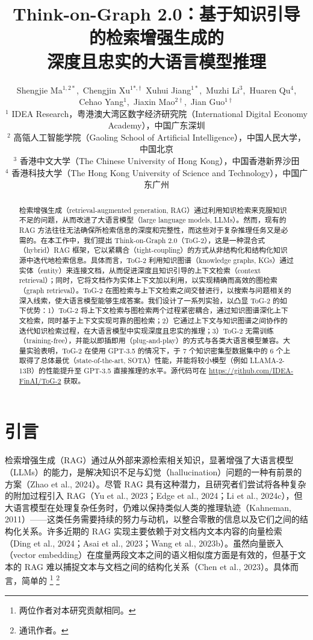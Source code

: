 \documentclass[11pt,UTF8,fontset=fandol]{ctexart}
\title{\textbf{Think-on-Graph 2.0：基于知识引导的检索增强生成的\\深度且忠实的大语言模型推理}}
\author{Shengjie Ma$^{1,2*}$,~Chengjin Xu$^{1*,\dagger}$~Xuhui Jiang$^{1*}$,~Muzhi Li$^{3}$,~Huaren Qu$^{4}$,\\
Cehao Yang$^{1}$,~Jiaxin Mao$^{2\dagger}$,~Jian Guo$^{1\dagger}$\\[0.3em]
\small $^{1}$ IDEA Research，粤港澳大湾区数字经济研究院（International Digital Economy Academy），中国广东深圳\\
\small $^{2}$ 高瓴人工智能学院（Gaoling School of Artificial Intelligence），中国人民大学，中国北京\\
\small $^{3}$ 香港中文大学（The Chinese University of Hong Kong），中国香港新界沙田\\
\small $^{4}$ 香港科技大学（The Hong Kong University of Science and Technology），中国广东广州}
\date{}
\newcommand{\toctwo}{ToG-2}
\begin{document}
\maketitle

\renewcommand{\thefootnote}{\arabic{footnote}}

\begin{abstract}
检索增强生成（retrieval-augmented generation, RAG）通过利用知识检索来克服知识不足的问题，从而改进了大语言模型（large language models, LLMs）。然而，现有的 RAG 方法往往无法确保所检索信息的深度和完整性，而这些对于复杂推理任务又是必需的。在本工作中，我们提出 Think-on-Graph 2.0（\toctwo{}），这是一种混合式（hybrid）RAG 框架，它以紧耦合（tight-coupling）的方式从非结构化和结构化知识源中迭代地检索信息。具体而言，\toctwo{} 利用知识图谱（knowledge graphs, KGs）通过实体（entity）来连接文档，从而促进深度且知识引导的上下文检索（context retrieval）；同时，它将文档作为实体上下文加以利用，以实现精确而高效的图检索（graph retrieval）。\toctwo{} 在图检索与上下文检索之间交替进行，以搜索与问题相关的深入线索，使大语言模型能够生成答案。我们设计了一系列实验，以凸显 \toctwo{} 的如下优势：1）\toctwo{} 将上下文检索与图检索两个过程紧密耦合，通过知识图谱深化上下文检索，同时基于上下文实现可靠的图检索；2）它通过上下文与知识图谱之间协作的迭代知识检索过程，在大语言模型中实现深度且忠实的推理；3）\toctwo{} 无需训练（training-free），并能以即插即用（plug-and-play）的方式与各类大语言模型兼容。大量实验表明，\toctwo{} 在使用 GPT-3.5 的情况下，于 7 个知识密集型数据集中的 6 个上取得了总体最优（state-of-the-art, SOTA）性能，并能将较小模型（例如 LLAMA-2-13B）的性能提升至 GPT-3.5 直接推理的水平。源代码可在 \url{https://github.com/IDEA-FinAI/ToG-2} 获取。
\end{abstract}

\section{引言}

检索增强生成（RAG）通过从外部来源检索相关知识，显著增强了大语言模型（LLMs）的能力，是解决知识不足与幻觉（hallucination）问题的一种有前景的方案（Zhao et al., 2024）。尽管 RAG 具有这种潜力，且研究者们尝试将各种复杂的附加过程引入 RAG（Yu et al., 2023；Edge et al., 2024；Li et al., 2024c），但大语言模型在处理复杂任务时，仍难以保持类似人类的推理轨迹（Kahneman, 2011）——这类任务需要持续的努力与动机，以整合零散的信息以及它们之间的结构化关系。许多近期的 RAG 实现主要依赖于对文档内文本内容的向量检索（Ding et al., 2024；Asai et al., 2023；Wang et al., 2023b）。虽然向量嵌入（vector embedding）在度量两段文本之间的语义相似度方面是有效的，但基于文本的 RAG 难以捕捉文本与文档之间的结构化关系（Chen et al., 2023）。具体而言，简单的%
\footnote{两位作者对本研究贡献相同。}%
\footnote{通讯作者。}
\end{document}

